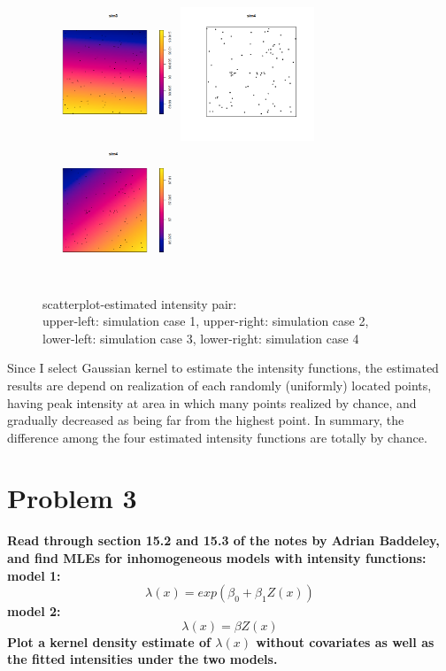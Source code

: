 \documentclass{article}
\begin{document}
\begin{figure}[!h]
    \includegraphics[width=4cm]{prob2_sim3_ker.png}
    \includegraphics[width=4cm]{prob2_sim4_scatterplot.png}
    \includegraphics[width=4cm]{prob2_sim4_ker.png}
    \caption{scatterplot-estimated intensity pair: \\
    upper-left: simulation case 1, upper-right: simulation case 2, \\
    lower-left: simulation case 3, lower-right: simulation case 4}
\end{figure}

Since I select Gaussian kernel to estimate the intensity functions, 
the estimated results are depend on realization of each randomly (uniformly) located points,
having peak intensity at area in which many points realized by chance, and gradually decreased as being far from the highest point.
In summary, the difference among the four estimated intensity functions are totally by chance.


\clearpage
\section{Problem 3}
\textbf{
Read through section 15.2 and 15.3 of the notes by Adrian Baddeley, and
find MLEs for inhomogeneous models with intensity functions:
model 1:
\[\lambda(x) = exp(\beta_0 + \beta_1 Z(x))\]
model 2:
\[\lambda(x) = \beta Z(x)\]
Plot a kernel density estimate of $\lambda(x)$ without covariates as well as the fitted intensities under the two models.
}
\end{document}
